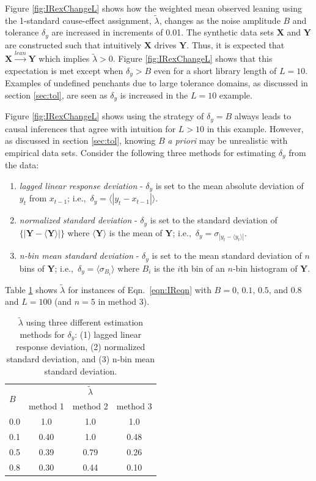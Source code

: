 \documentclass[twocolumn,aps,pre,groupedaddress]{revtex4-1}
\begin{document}
Figure \ref{fig:IRexChangeL} shows how the weighted mean observed leaning using the 1-standard cause-effect assignment, $\tilde{\lambda}$, changes as the noise amplitude $B$ and tolerance $\delta_y$ are increased in increments of 0.01.  The synthetic data sets $\mathbf{X}$ and $\mathbf{Y}$ are constructed such that intuitively $\mathbf{X}$ drives $\mathbf{Y}$.  Thus, it is expected that $\mathbf{X}\xrightarrow{lean}\mathbf{Y}$ which implies $\tilde{\lambda} > 0$.  Figure \ref{fig:IRexChangeL} shows that this expectation is met except when $\delta_y > B$ even for a short library length of $L=10$.  Examples of undefined penchants due to large tolerance domains, as discussed in section \ref{sec:tol}, are seen as $\delta_y$ is increased in the $L=10$ example.

Figure \ref{fig:IRexChangeL} shows using the strategy of $\delta_y = B$ always leads to causal inferences that agree with intuition for $L>10$ in this example.  However, as discussed in section \ref{sec:tol}, knowing $B$ {\em a priori} may be unrealistic with empirical data sets.  Consider the following three methods for estimating $\delta_y$ from the data:
\begin{enumerate}
\item {\em lagged linear response deviation} - $\delta_y$ is set to the mean absolute deviation of $y_t$ from $x_{t-1}$; i.e.,\ $\delta_y = \langle|y_t-x_{t-1}|\rangle$.
\item {\em normalized standard deviation} - $\delta_y$ is set to the standard deviation of $\{|\mathbf{Y}-\langle\mathbf{Y}\rangle|\}$ where $\langle\mathbf{Y}\rangle$ is the mean of $\mathbf{Y}$; i.e.,\ $\delta_y = \sigma_{|y_t-\langle y_t\rangle|}$.
\item {\em n-bin mean standard deviation} - $\delta_y$ is set to the mean standard deviation of $n$ bins of $\mathbf{Y}$; i.e.,\ $\delta_y = \langle \sigma_{B_i}\rangle$ where $B_i$ is the $i$th bin of an $n$-bin histogram of $\mathbf{Y}$.    
\end{enumerate}  
Table \ref{tab:IRlagTolComp} shows $\tilde{\lambda}$ for instances of Eqn.\ \ref{eqn:IReqn} with $B = 0$, $0.1$, $0.5$, and $0.8$ and $L=100$ (and $n=5$ in method 3).
\begin{table}
\begin{tabular}{l|ccc}
 \multirow{2}{*}{ $B$ }& \multicolumn{3}{|c}{$\tilde{\lambda}$}\\
 \cline{2-4}
 & method 1 & method 2 & method 3\\
\hline
0.0 & 1.0 & 1.0 & 1.0\\
0.1 & 0.40 & 1.0 & 0.48\\
0.5 & 0.39 & 0.79 & 0.26\\
0.8 & 0.30 & 0.44 & 0.10\\
\end{tabular}
\caption{$\tilde{\lambda}$ using three different estimation methods for $\delta_y$: (1) lagged linear response deviation, (2) normalized standard deviation, and (3) n-bin mean standard deviation.}
\label{tab:IRlagTolComp}
\end{table}
\end{document}
